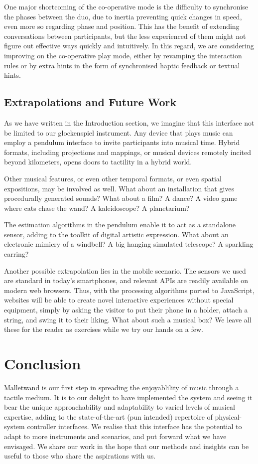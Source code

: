 \documentclass{nime-alternate} %
\begin{document}
One major shortcoming of the co-operative mode is the difficulty to synchronise the phases between the duo, due to inertia preventing quick changes in speed, even more so regarding phase and position. This has the benefit of extending conversations between participants, but the less experienced of them might not figure out effective ways quickly and intuitively. In this regard, we are considering improving on the co-operative play mode, either by revamping the interaction rules or by extra hints in the form of synchronised haptic feedback or textual hints.

\subsection{Extrapolations and Future Work}
As we have written in the Introduction section, we imagine that this interface not be limited to our glockenspiel instrument. Any device that plays music can employ a pendulum interface to invite participants into musical time. Hybrid formats, including projections and mappings, or musical devices remotely incited beyond kilometers, opens doors to tactility in a hybrid world.

Other musical features, or even other temporal formats, or even spatial expositions, may be involved as well. What about an installation that gives procedurally generated sounds? What about a film? A dance? A video game where cats chase the wand? A kaleidoscope? A planetarium?

The estimation algorithms in the pendulum enable it to act as a standalone sensor, adding to the toolkit of digital artistic expression. What about an electronic mimicry of a windbell? A big hanging simulated telescope? A sparkling earring?

Another possible extrapolation lies in the mobile scenario. The sensors we used are standard in today's smartphones, and relevant APIs are readily available on modern web browsers. Thus, with the processing algorithms ported to JavaScript, websites will be able to create novel interactive experiences without special equipment, simply by asking the visitor to put their phone in a holder, attach a string, and swing it to their liking. What about such a musical box? We leave all these for the reader as exercises while we try our hands on a few.

\section{Conclusion}
Malletwand is our first step in spreading the enjoyablility of music through a tactile medium. It is to our delight to have implemented the system and seeing it bear the unique approachability and adaptability to varied levels of musical expertise, adding to the state-of-the-art (pun intended) repertoire of physical-system controller interfaces. We realise that this interface has the potential to adapt to more instruments and scenarios, and put forward what we have envisaged. We share our work in the hope that our methods and insights can be useful to those who share the aspirations with us.
\end{document}
